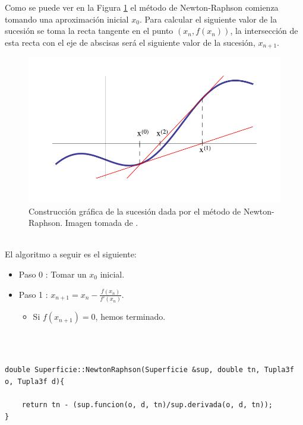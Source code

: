 Como se puede ver en la Figura \ref{fig:etiq_7} el método de Newton-Raphson comienza tomando una aproximación inicial $x_0$. Para calcular el siguiente valor de la sucesión se toma la recta tangente en el punto $(x_n, f(x_n))$, la intersección de esta recta con el eje de abscisas será el siguiente valor de la sucesión, $x_{n+1}$.
${ }$\\

\begin{figure}[h]
	\begin{center}
		\includegraphics[width=1.0\textwidth]{imagenes/newton.png}
	\end{center}
	\caption{Construcción gráfica de la sucesión dada por el método de Newton-Raphson. Imagen tomada de \cite{CarmenS}.}
	\label{fig:etiq_7}
\end{figure}
${ }$\\

El algoritmo a seguir es el siguiente:

\begin{itemize}
	\item Paso 0 : Tomar un $x_0$ inicial.
	\item Paso 1 : $x_{n+1} = x_n - \frac{f(x_n)}{f'(x_n)}$.
	\begin{itemize}
		\item Si $f(x_{n+1}) = 0$, hemos terminado.
	\end{itemize}
\end{itemize}
${ }$\\

\begin{lstlisting}[style=Consola]

double Superficie::NewtonRaphson(Superficie &sup, double tn, Tupla3f o, Tupla3f d){

	return tn - (sup.funcion(o, d, tn)/sup.derivada(o, d, tn));
}

\end{lstlisting}
${ }$\\



